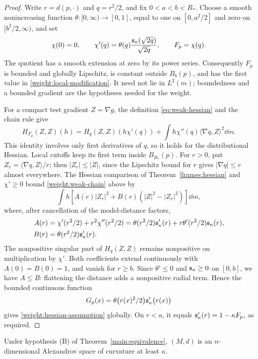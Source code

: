 \begin{proof}
Write \(r=d(p,\cdot)\) and \(q=r^2/2\), and fix \(0<a<b<R_*\).
Choose a smooth nonincreasing function \(\theta\colon[0,\infty)\to[0,1]\),
equal to one on \([0,a^2/2]\) and zero on
\([b^2/2,\infty)\), and set
\[
\chi(0)=0,\qquad
\chi'(q)=\theta(q)\frac{\mathfrak s_\kappa(\sqrt{2q})}{\sqrt{2q}},\qquad
F_p=\chi(q).
\]
The quotient has a smooth extension at zero by its power
series. Consequently \(F_p\) is bounded and globally Lipschitz,
is constant outside \(B_b(p)\), and has the first value in
\eqref{weight:local-modification}. It need not lie in \(L^2(m)\);
boundedness and a bounded gradient are the hypotheses needed
for the weight.

For a compact test gradient \(Z=\nabla g\), the definition
\eqref{eq:weak-hessian} and the chain rule give
\begin{equation}
\label{weight:weak-chain}
H_{F_p}(Z,Z)(h)
=H_q(Z,Z)(h\chi'(q))
 +\int h\chi''(q)\langle\nabla q,Z\rangle^2\dd m.
\end{equation}
This identity involves only first derivatives of \(q\), so it
holds for the distributional Hessian. Local cutoffs keep its
first term inside \(B_{R_*}(p)\).
For \(r>0\), put
\(Z_r=\langle\nabla q,Z\rangle/r\); then
\(|Z_r|\le|Z|\), since the Lipschitz bound for \(r\) gives
\(|\nabla q|\le r\) almost everywhere.
The Hessian comparison of Theorem~\ref{frames:hessian} and
\(\chi'\ge0\) bound \eqref{weight:weak-chain} above by
\[
\int h\left[A(r)|Z_r|^2
                 +B(r)(|Z|^2-|Z_r|^2)\right]\dd m,
\]
where, after cancellation of the model-distance factors,
\begin{align*}
A(r)&=\chi'(r^2/2)+r^2\chi''(r^2/2)
     =\theta(r^2/2)\mathfrak s'_\kappa(r)+r\theta'(r^2/2)\mathfrak s_\kappa(r),\\
B(r)&=\theta(r^2/2)\mathfrak s'_\kappa(r).
\end{align*}
The nonpositive singular part of \(H_q(Z,Z)\) remains
nonpositive on multiplication by \(\chi'\).
Both coefficients extend continuously with \(A(0)=B(0)=1\),
and vanish for \(r\ge b\). Since \(\theta'\le0\) and
\(\mathfrak s_\kappa\ge0\) on \([0,b]\), we have \(A\le B\): flattening
the distance adds a nonpositive radial term. Hence the bounded
continuous function
\[
G_p(x)=\theta\bigl(r(x)^2/2\bigr)\mathfrak s'_\kappa\bigl(r(x)\bigr)
\]
gives \eqref{weight:hessian-assumption} globally.
On \(r<a\), it equals \(\mathfrak s'_\kappa(r)=1-\kappa F_p\), as required.
\end{proof}

\begin{theorem}
\label{weight:alexandrov}
Under hypothesis \textup{(B)} of Theorem~\ref{main:equivalence},
\((M,d)\) is an \(n\)-dimensional Alexandrov space of curvature
at least \(\kappa\).
\end{theorem}

